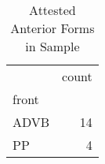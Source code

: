 \begin{table}[htbp!]
\centering
\caption{Attested Anterior Forms in Sample}
\label{table:ant_phtype}
\begin{tabular}{lr}
\toprule
{} &  count \\
front &        \\
\midrule
ADVB  &     14 \\
PP    &      4 \\
\bottomrule
\end{tabular}
\end{table}
